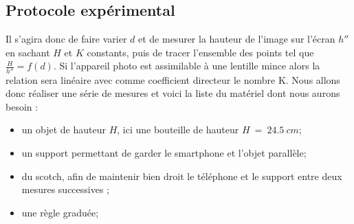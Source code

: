 \documentclass[12pt,a4paper]{article}
\begin{document}
\subsection{Protocole expérimental}
Il s'agira donc de faire varier $d$ et de mesurer la hauteur de l'image sur l'écran $h''$ en sachant $H$ et $K$ constants, puis de tracer l'ensemble des points tel que $\frac{H}{h''} = f(d)$. Si l'appareil photo est assimilable à une lentille mince alors la relation sera linéaire avec comme coefficient directeur le nombre K. Nous allons donc réaliser une série de mesures et voici la liste du matériel dont nous aurons besoin :
\begin{itemize}
\item un objet de hauteur $H$, ici une bouteille de hauteur $H~=~24.5~cm$;
\item un support permettant de garder le smartphone et l'objet parallèle;
\item du scotch, afin de maintenir bien droit le téléphone et le support entre deux mesures successives ;
\item une règle graduée;
\end{itemize}
\end{document}
